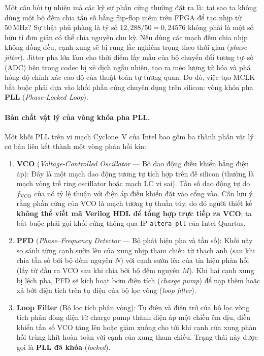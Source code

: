 Một câu hỏi tự nhiên mà các kỹ sư phần cứng thường đặt ra là: tại sao ta không dùng một bộ đếm chia tần số bằng flip-flop mềm trên FPGA để tạo nhịp từ $50\,\text{MHz}$? Sự thật phũ phàng là tỷ số $12{,}288 / 50 = 0{,}24576$ không phải là một số hữu tỉ đơn giản có thể chia nguyên chu kỳ. Nếu dùng các mạch đếm chia nhịp không đồng đều, cạnh xung sẽ bị rung lắc nghiêm trọng theo thời gian (\emph{phase jitter}). Jitter pha lớn làm cho thời điểm lấy mẫu của bộ chuyển đổi tương tự--số (ADC) bên trong codec bị xê dịch ngẫu nhiên, tạo ra méo lượng tử hóa và phá hỏng độ chính xác cao độ của thuật toán tự tương quan. Do đó, việc tạo MCLK bắt buộc phải dựa vào khối phần cứng chuyên dụng trên silicon: vòng khóa pha \textbf{PLL} (\emph{Phase-Locked Loop}).

\paragraph{Bản chất vật lý của vòng khóa pha PLL.}
Một khối PLL trên vi mạch Cyclone~V của Intel bao gồm ba thành phần vật lý cơ bản liên kết thành một vòng phản hồi kín:
\begin{enumerate}
    \item \textbf{VCO} (\emph{Voltage-Controlled Oscillator} --- Bộ dao động điều khiển bằng điện áp): Đây là một mạch dao động tương tự tích hợp trên đế silicon (thường là mạch vòng trễ ring oscillator hoặc mạch LC vi sai). Tần số dao động tự do $f_{\mathrm{VCO}}$ của nó tỷ lệ thuận với điện áp điều khiển đặt vào cổng vào. Cần lưu ý rằng phần cứng của VCO là mạch tương tự thuần túy, do đó người thiết kế \textbf{không thể viết mã Verilog HDL để tổng hợp trực tiếp ra VCO}; ta bắt buộc phải gọi khối cứng thông qua IP \texttt{altera\_pll} của Intel Quartus.
    \item \textbf{PFD} (\emph{Phase--Frequency Detector} --- Bộ phát hiện pha và tần số): Khối này so sánh từng cạnh sườn lên của xung nhịp tham chiếu từ thạch anh (sau khi chia tần số bởi bộ đếm nguyên $N$) với cạnh sườn lên của tín hiệu phản hồi (lấy từ đầu ra VCO sau khi chia bởi bộ đếm nguyên $M$). Khi hai cạnh xung bị lệch pha, PFD sẽ kích hoạt bơm điện tích (\emph{charge pump}) để nạp thêm hoặc xả bớt điện tích trên tụ điện của bộ lọc vòng (\emph{loop filter}).
    \item \textbf{Loop Filter} (Bộ lọc tích phân vòng): Tụ điện và điện trở của bộ lọc vòng tích phân dòng điện từ charge pump thành điện áp một chiều êm dịu, điều khiển tần số VCO tăng lên hoặc giảm xuống cho tới khi cạnh của xung phản hồi trùng khít hoàn toàn với cạnh của xung tham chiếu. Trạng thái này được gọi là \textbf{PLL đã khóa} (\emph{locked}).
\end{enumerate}

